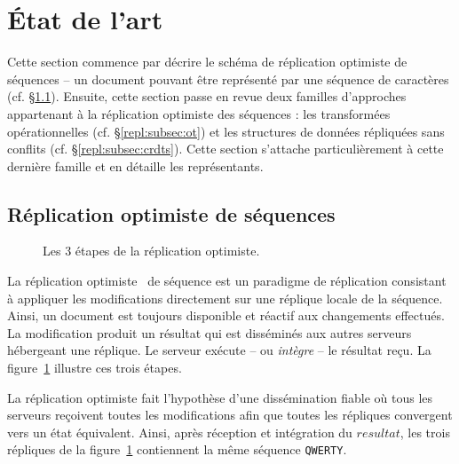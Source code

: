 

\section{État de l'art}
\label{repl:sec:stateoftheart}

Cette section commence par décrire le schéma de réplication optimiste de
séquences -- un document pouvant être représenté par une séquence de caractères
(cf. §\ref{repl:subsec:optimistic}).  Ensuite, cette section passe en revue deux
familles d'approches appartenant à la réplication optimiste des séquences : les
transformées opérationnelles (cf. §\ref{repl:subsec:ot}) et les structures de
données répliquées sans conflits (cf. §\ref{repl:subsec:crdts}). Cette section
s'attache particulièrement à cette dernière famille et en détaille les
représentants.

\subsection{Réplication optimiste de séquences}
\label{repl:subsec:optimistic}

\begin{figure}
  \begin{center}
    
    \caption[Étapes de la réplication
    optimiste]{\label{repl:fig:optimisticsteps} Les 3 étapes de la réplication
      optimiste.}    
  \end{center}
\end{figure}

La réplication optimiste~\cite{demers1987epidemic, johnson1975maintenance,
  ladin1992providing, saito2005optimistic} de séquence est un paradigme de
réplication consistant à appliquer les modifications directement sur une
réplique locale de la séquence.  Ainsi, un document est toujours disponible et
réactif aux changements effectués. La modification produit un résultat qui est
disséminés aux autres serveurs hébergeant une réplique. Le serveur exécute -- ou
\emph{intègre} -- le résultat reçu. La figure~\ref{repl:fig:optimisticsteps}
illustre ces trois étapes.

\noindent La réplication optimiste fait l'hypothèse d'une dissémination fiable
où tous les serveurs reçoivent toutes les modifications afin que toutes les
répliques convergent vers un état équivalent. Ainsi, après réception et
intégration du $resultat$, les trois répliques de la
figure~\ref{repl:fig:optimisticsteps} contiennent la même séquence
\texttt{QWERTY}.

